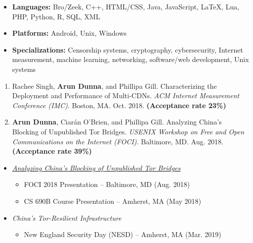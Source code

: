 
\begin{itemize}
  \item \textbf{Languages:} Bro/Zeek, C++, HTML/CSS, Java, JavaScript, LaTeX, Lua, PHP, Python, R, SQL, XML
  \item \textbf{Platforms:} Android, Unix, Windows
  \item \textbf{Specializations:} Censorship systems, cryptography, cybersecurity, Internet measurement, machine learning, networking, software/web development, Unix systems

\end{itemize}


\begin{enumerate}
 \item Rachee Singh, \textbf{Arun Dunna}, and Phillipa Gill. Characterizing the Deployment and Performance of Multi-CDNs. \textit{ACM Internet Measurement Conference (IMC)}. Boston, MA. Oct. 2018. \textbf{(Acceptance rate 23\%)}
 \item \textbf{Arun Dunna}, Ciar\'an O'Brien, and Phillipa Gill. Analyzing China's Blocking of Unpublished Tor Bridges. \textit{USENIX Workshop on Free and Open Communications on the Internet (FOCI)}. Baltimore, MD. Aug. 2018. \textbf{(Acceptance rate 39\%)}
\end{enumerate}

\newpage


\begin{itemize}
\item
    {\it \href{https://adunna.me/foci-2018-tor/}{Analyzing China's Blocking of Unpublished Tor Bridges}}
    \begin{itemize}
        \item FOCI 2018 Presentation -- Baltimore, MD (Aug. 2018)
        \item CS 690B Course Presentation -- Amherst, MA (May 2018)
    \end{itemize}

\end{itemize}


\begin{itemize}
\item
    {\it China's Tor-Resilient Infrastructure}
    \begin{itemize}
        \item New England Security Day (NESD) -- Amherst, MA (Mar. 2019)
    \end{itemize}

\end{itemize}

